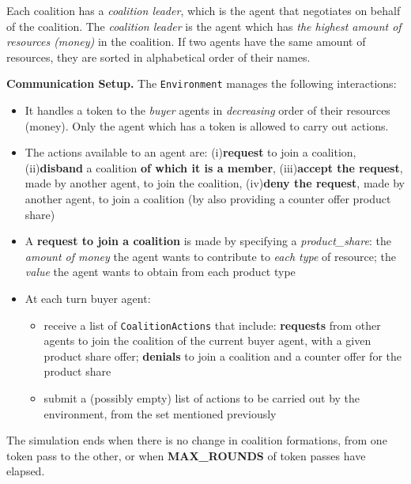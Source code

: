 \documentclass[a4paper, 12pt, twoside]{article}
\begin{document}
Each coalition has a \textit{coalition leader}, which is the agent that negotiates on behalf of the coalition. The \textit{coalition leader} is the agent which has \textit{the highest amount of resources (money)} in the coalition. If two agents have the same amount of resources, they are sorted in alphabetical order of their names.

%
\bigskip
%
\textbf{Communication Setup.}
The \texttt{Environment} manages the following interactions: 

\begin{itemize}
	\item It handles a token to the \textit{buyer} agents in \textit{decreasing} order of their resources (money). Only the agent which has a token is allowed to carry out actions. 
	\item The actions available to an agent are: (i)\textbf{request} to join a coalition, (ii)\textbf{disband} a coalition \textbf{of which it is a member}, (iii)\textbf{accept the request}, made by another agent, to join the coalition, (iv)\textbf{deny the request}, made by another agent, to join a coalition (by also providing a counter offer product share)
	\item A \textbf{request to join a coalition} is made by specifying a \textit{product\_share}: the \textit{amount of money} the agent wants to contribute to \textit{each type} of resource; the \textit{value} the agent wants to obtain from each product type
	\item At each turn buyer agent:
		\begin{itemize}
			\item receive a list of \texttt{CoalitionActions} that include: \textbf{requests} from other agents to join the coalition of the current buyer agent, with a given product share offer; \textbf{denials} to join a coalition and a counter offer for the product share
			\item submit a (possibly empty) list of actions to be carried out by the environment, from the set mentioned previously
		\end{itemize}
\end{itemize}

The simulation ends when there is no change in coalition formations, from one token pass to the other, or when \textbf{MAX\_ROUNDS} of token passes have elapsed.

\end{document}
